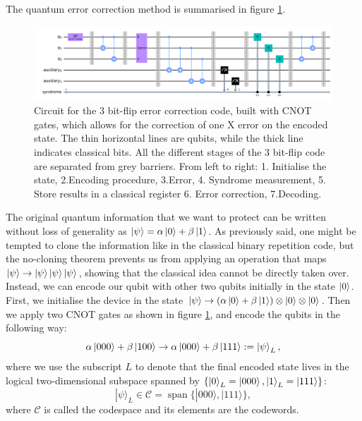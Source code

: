 The quantum error correction method is summarised in figure \ref{fig:3fq}.
\begin{figure}[h!]
    \centering
    \includegraphics[width=\textwidth]{Mainmatter/images/3bitflipcode.png}
    \caption{Circuit for the 3 bit-flip error correction code, built with CNOT gates, which allows for the correction of one X error on the encoded state. 
    The thin horizontal lines are qubits, while the thick line indicates classical bits. 
    All the different stages of the 3 bit-flip code are separated from grey barriers. From left to right: 1. Initialise the state, 2.Encoding procedure, 3.Error, 4. Syndrome measurement, 5. Store results in a classical register 6. Error correction, 7.Decoding. }
    \label{fig:3fq}
\end{figure}

The original quantum information that we want to protect can be written without loss of generality as $\ket{\psi} = \alpha\ket{0}+\beta\ket{1}$.
As previously said, one might be tempted to clone the information like in the classical binary repetition code, but the no-cloning theorem prevents us from applying an operation that maps $\ket{\psi} \to \ket{\psi}\ket{\psi}\ket{\psi}$, showing that the classical idea cannot be directly taken over.
Instead, we can encode our qubit with other two qubits initially in the state $\ket{0}$. First, we initialise the device in the state $\ket{\psi} \to  (\alpha\ket{0}+\beta\ket{1})\otimes \ket{0} \otimes \ket{0}$. Then we apply two CNOT gates as shown in figure \ref{fig:3fq}, and encode the qubits in the following way: 
\begin{equation*}
  \alpha\ket{000}+\beta\ket{100} \to \alpha\ket{000}+\beta\ket{111} := \ket{\psi}_L,
\end{equation*}
where we use the subscript $L$ to denote that the final encoded state lives in the logical two-dimensional subspace spanned by $\{\ket{0}_L = \ket{000} , \ket{1}_L = \ket{111}\}$:
$$
|\psi\rangle_{L} \in \mathcal{C}=\operatorname{span}\{|000\rangle,|111\rangle\},
$$
where $\mathcal{C}$ is called the codespace and its elements are the codewords.%



